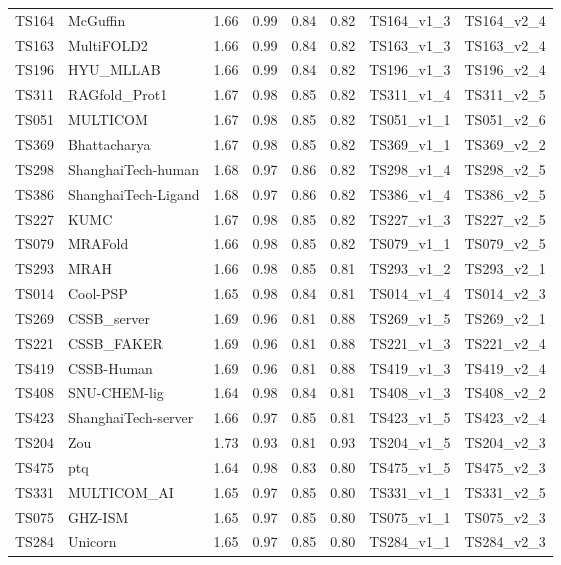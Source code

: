\begin{longtable}{llllllll}
TS164 & McGuffin & 1.66 & 0.99 & 0.84 & 0.82 & TS164\_v1\_3 & TS164\_v2\_4 \\ 
TS163 & MultiFOLD2 & 1.66 & 0.99 & 0.84 & 0.82 & TS163\_v1\_3 & TS163\_v2\_4 \\ 
TS196 & HYU\_MLLAB & 1.66 & 0.99 & 0.84 & 0.82 & TS196\_v1\_3 & TS196\_v2\_4 \\ 
TS311 & RAGfold\_Prot1 & 1.67 & 0.98 & 0.85 & 0.82 & TS311\_v1\_4 & TS311\_v2\_5 \\ 
TS051 & MULTICOM & 1.67 & 0.98 & 0.85 & 0.82 & TS051\_v1\_1 & TS051\_v2\_6 \\ 
TS369 & Bhattacharya & 1.67 & 0.98 & 0.85 & 0.82 & TS369\_v1\_1 & TS369\_v2\_2 \\ 
TS298 & ShanghaiTech-human & 1.68 & 0.97 & 0.86 & 0.82 & TS298\_v1\_4 & TS298\_v2\_5 \\ 
TS386 & ShanghaiTech-Ligand & 1.68 & 0.97 & 0.86 & 0.82 & TS386\_v1\_4 & TS386\_v2\_5 \\ 
TS227 & KUMC & 1.67 & 0.98 & 0.85 & 0.82 & TS227\_v1\_3 & TS227\_v2\_5 \\ 
TS079 & MRAFold & 1.66 & 0.98 & 0.85 & 0.82 & TS079\_v1\_1 & TS079\_v2\_5 \\ 
TS293 & MRAH & 1.66 & 0.98 & 0.85 & 0.81 & TS293\_v1\_2 & TS293\_v2\_1 \\ 
TS014 & Cool-PSP & 1.65 & 0.98 & 0.84 & 0.81 & TS014\_v1\_4 & TS014\_v2\_3 \\ 
TS269 & CSSB\_server & 1.69 & 0.96 & 0.81 & 0.88 & TS269\_v1\_5 & TS269\_v2\_1 \\ 
TS221 & CSSB\_FAKER & 1.69 & 0.96 & 0.81 & 0.88 & TS221\_v1\_3 & TS221\_v2\_4 \\ 
TS419 & CSSB-Human & 1.69 & 0.96 & 0.81 & 0.88 & TS419\_v1\_3 & TS419\_v2\_4 \\ 
TS408 & SNU-CHEM-lig & 1.64 & 0.98 & 0.84 & 0.81 & TS408\_v1\_3 & TS408\_v2\_2 \\ 
TS423 & ShanghaiTech-server & 1.66 & 0.97 & 0.85 & 0.81 & TS423\_v1\_5 & TS423\_v2\_4 \\ 
TS204 & Zou & 1.73 & 0.93 & 0.81 & 0.93 & TS204\_v1\_5 & TS204\_v2\_3 \\ 
TS475 & ptq & 1.64 & 0.98 & 0.83 & 0.80 & TS475\_v1\_5 & TS475\_v2\_3 \\ 
TS331 & MULTICOM\_AI & 1.65 & 0.97 & 0.85 & 0.80 & TS331\_v1\_1 & TS331\_v2\_5 \\ 
TS075 & GHZ-ISM & 1.65 & 0.97 & 0.85 & 0.80 & TS075\_v1\_1 & TS075\_v2\_3 \\ 
TS284 & Unicorn & 1.65 & 0.97 & 0.85 & 0.80 & TS284\_v1\_1 & TS284\_v2\_3 \\ 

\end{longtable}

